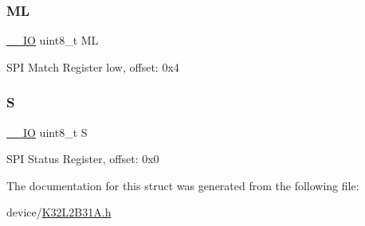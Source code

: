 \subsubsection{\texorpdfstring{ML}{ML}}
{\footnotesize\ttfamily \mbox{\hyperlink{core__cm0plus_8h_aec43007d9998a0a0e01faede4133d6be}{\+\_\+\+\_\+\+IO}} uint8\+\_\+t ML}

S\+PI Match Register low, offset\+: 0x4 \mbox{\label{struct_s_p_i___type_a0542ffc7618a0893938748eef9c87474}} 
\subsubsection{\texorpdfstring{S}{S}}
{\footnotesize\ttfamily \mbox{\hyperlink{core__cm0plus_8h_aec43007d9998a0a0e01faede4133d6be}{\+\_\+\+\_\+\+IO}} uint8\+\_\+t S}

S\+PI Status Register, offset\+: 0x0 

The documentation for this struct was generated from the following file\+:\begin{DoxyCompactItemize}
\item 
device/\mbox{\hyperlink{_k32_l2_b31_a_8h}{K32\+L2\+B31\+A.\+h}}\end{DoxyCompactItemize}
